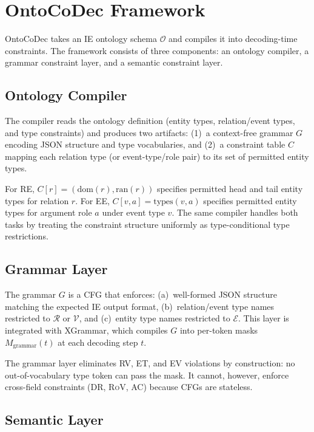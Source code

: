 \documentclass[11pt,a4paper]{article}
\newcommand{\ours}{OntoCoDec}
\newcommand{\drsym}{\textsc{DR}}
\newcommand{\rvsym}{\textsc{RV}}
\newcommand{\etsym}{\textsc{ET}}
\newcommand{\evsym}{\textsc{EV}}
\newcommand{\rovsym}{\textsc{RoV}}
\newcommand{\acsym}{\textsc{AC}}
\begin{document}
\section{\ours{} Framework}
\label{sec:method}

\ours{} takes an IE ontology schema $\mathcal{O}$ and compiles it into decoding-time constraints. The framework consists of three components: an ontology compiler, a grammar constraint layer, and a semantic constraint layer.

\subsection{Ontology Compiler}

The compiler reads the ontology definition (entity types, relation/event types, and type constraints) and produces two artifacts: (1)~a context-free grammar $G$ encoding JSON structure and type vocabularies, and (2)~a constraint table $C$ mapping each relation type (or event-type/role pair) to its set of permitted entity types.

For RE, $C[r] = (\text{dom}(r), \text{ran}(r))$ specifies permitted head and tail entity types for relation $r$. For EE, $C[v, a] = \text{types}(v, a)$ specifies permitted entity types for argument role $a$ under event type $v$. The same compiler handles both tasks by treating the constraint structure uniformly as type-conditional type restrictions.

\subsection{Grammar Layer}

The grammar $G$ is a CFG that enforces: (a)~well-formed JSON structure matching the expected IE output format, (b)~relation/event type names restricted to $\mathcal{R}$ or $\mathcal{V}$, and (c)~entity type names restricted to $\mathcal{E}$. This layer is integrated with XGrammar, which compiles $G$ into per-token masks $M_\text{grammar}(t)$ at each decoding step $t$.

The grammar layer eliminates \rvsym{}, \etsym{}, and \evsym{} violations by construction: no out-of-vocabulary type token can pass the mask. It cannot, however, enforce cross-field constraints (\drsym{}, \rovsym{}, \acsym{}) because CFGs are stateless.

\subsection{Semantic Layer}
\end{document}
